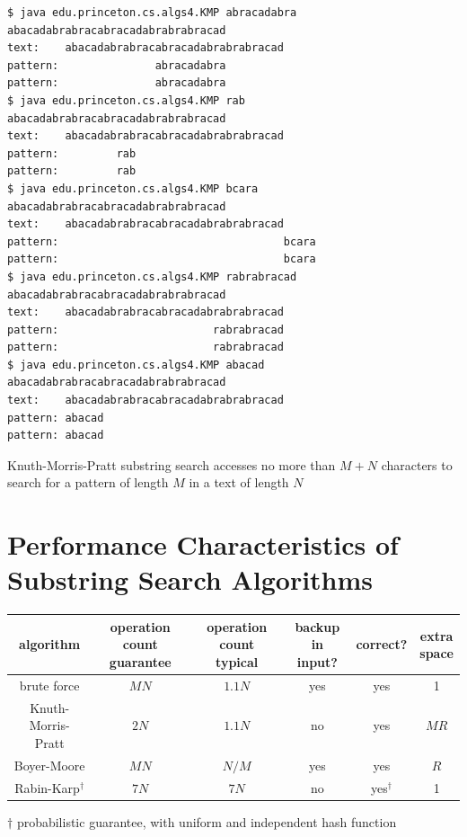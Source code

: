 \documentclass[8pt,a4paper,compress]{beamer}
\begin{document}
\begin{frame}[fragile]
\pause

\begin{lstlisting}[language={}]
$ java edu.princeton.cs.algs4.KMP abracadabra abacadabrabracabracadabrabrabracad
text:    abacadabrabracabracadabrabrabracad
pattern:               abracadabra
pattern:               abracadabra
$ java edu.princeton.cs.algs4.KMP rab abacadabrabracabracadabrabrabracad
text:    abacadabrabracabracadabrabrabracad
pattern:         rab
pattern:         rab
$ java edu.princeton.cs.algs4.KMP bcara abacadabrabracabracadabrabrabracad
text:    abacadabrabracabracadabrabrabracad
pattern:                                   bcara
pattern:                                   bcara
$ java edu.princeton.cs.algs4.KMP rabrabracad abacadabrabracabracadabrabrabracad
text:    abacadabrabracabracadabrabrabracad
pattern:                        rabrabracad
pattern:                        rabrabracad
$ java edu.princeton.cs.algs4.KMP abacad abacadabrabracabracadabrabrabracad
text:    abacadabrabracabracadabrabrabracad
pattern: abacad
pattern: abacad
\end{lstlisting}

\pause
\bigskip

Knuth-Morris-Pratt substring search accesses no more than $M + N$ characters to search for a pattern of length $M$ in a text of length $N$
\end{frame}

\section{Performance Characteristics of Substring Search Algorithms}
\begin{frame}[fragile]
\pause

\begin{center}
\begin{tabular}{cccccc}
algorithm & \makecell{operation count \\ guarantee} & \makecell{operation count \\ typical} & \makecell{backup \\ in input?} & correct? & \makecell{extra \\ space} \\ \hline
brute force & $MN$ & $1.1N$ & yes & yes & 1 \\
\makecell{Knuth-Morris-\\Pratt} & $2N$ & $1.1N$ & no & yes & $MR$ \\
Boyer-Moore & $MN$ & $N/M$ & yes & yes & $R$ \\
Rabin-Karp$^\dagger$ & $7N$ & $7N$ & no & yes$^\dagger$ & 1
\end{tabular}

\bigskip

$\dagger$ probabilistic guarantee, with uniform and independent hash function
\end{center}
\end{frame}
\end{document}
